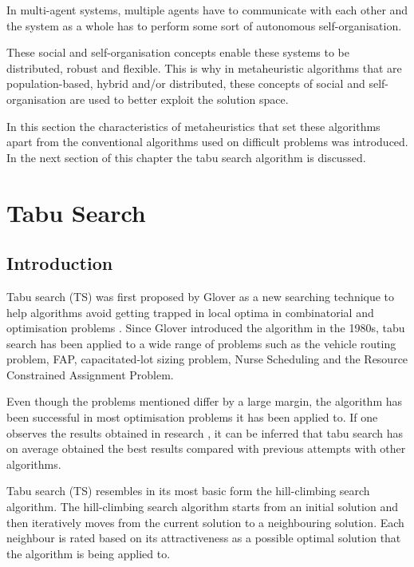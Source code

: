 In multi-agent systems, multiple agents have to communicate with each other and the system as a whole has to perform some sort of autonomous self-organisation\cite{Self-AdaptiveMeta}.

These social and self-organisation concepts enable these systems to be distributed, robust and flexible. This is why in metaheuristic algorithms that are population-based, hybrid and/or distributed, these concepts of social and self-organisation  are used to better exploit the solution space\cite{Self-AdaptiveMeta}.

In this section the characteristics of metaheuristics that set these algorithms apart from the conventional algorithms used on difficult problems was introduced. In the next section of this chapter the tabu search algorithm is discussed.
\section{Tabu Search}
\label{sec:tabusearch}
\subsection{Introduction}
\label{sec:TSIntroduction}
Tabu search (TS) was first proposed by Glover\cite{Glover89} as a new searching technique to help algorithms avoid getting trapped in local optima in combinatorial and optimisation problems \cite{TabuRCAProblem}. Since Glover introduced the algorithm in the 1980s, tabu search has been applied to a wide range of problems such as the vehicle routing problem\cite{TabuVechicleRoutingWithTimeWindows}, FAP\cite{TabuMontemanniSmith}, capacitated-lot sizing problem\cite{TabuCarryOver}, Nurse Scheduling\cite{TabuNurse} and the Resource Constrained Assignment Problem\cite{TabuRCAProblem}. 

Even though the problems mentioned differ by a large margin, the algorithm has been successful in most optimisation problems it has been applied to. If one observes the results obtained in research \cite{TabuMontemanniSmith,tabuglobalplanning3g}, it can be inferred that tabu search has on average obtained the best results compared with previous attempts with other algorithms. 

Tabu search (TS) resembles in its most basic form the hill-climbing search algorithm\cite{TabuBiddingStrats}. The hill-climbing search algorithm starts from an initial solution and then iteratively moves from the current solution to a neighbouring solution\cite{AIModernApproach}. Each neighbour is rated based on its attractiveness as a possible optimal solution that the algorithm is being applied to\cite{AIModernApproach}. 


